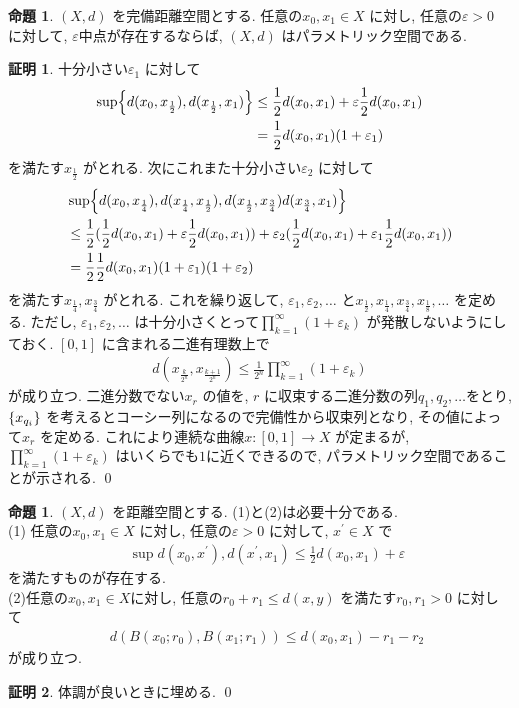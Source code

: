 \documentclass[platex, driver=dvipdfm, ja = standard, 10pt, fleqn, label-section=none]{bxjsarticle}
\theoremstyle{definition}
\newtheorem{prop}[dfn]{命題}
\newtheorem*{pf*}{証明}
\newcommand{\veps}{\varepsilon}
\newcommand{\cbra}[1]{\mleft\{#1\mright\}}
\renewcommand{\;}{\, ; \,}
\begin{document}
\begin{prop}$(X, d)$ を完備距離空間とする. 任意の$x_0, x_1 \in X$ に対し, 任意の$\veps > 0$ に対して, $\veps$中点が存在するならば, $(X, d)$ はパラメトリック空間である. 
\end{prop}
\begin{pf*}
十分小さい$\veps_1$ に対して
\begin{align*}  \sup \cbra{ d(x_0 ,  x_{\frac{1}{2}}     ) , d(x_{\frac{1}{2}}  , x_1)}    & \leq \frac{1}{2} d(x_0, x_1) + \veps \frac{1}{2} d(x_0, x_1)  \\
&= \frac{1}{2} d(x_0, x_1)  (1 + \veps_1) \end{align*}
を満たす$x_{\frac{1}{2}} $ がとれる. 次にこれまた十分小さい$\veps_2$ に対して
\begin{align*} & \sup \cbra{ d(x_0 ,  x_{\frac{1}{4}} ) , d(x_{\frac{1}{4}}, x_{\frac{1}{2}}  ), d(x_{\frac{1}{2}}, x_{\frac{3}{4}} ) d(x_{\frac{3}{4}}  , x_1)}     \\
& \leq \frac{1}{2}( \frac{1}{2} d(x_0, x_1)  + \veps \frac{1}{2}d(x_0, x_1)  ) + \veps_2 (\frac{1}{2} d(x_0, x_1)  + \veps_1 \frac{1}{2} d(x_0, x_1) ) \\
&= \frac{1}{2}\frac{1}{2} d(x_0, x_1)  (1 + \veps _1) (1 + \veps_2) \end{align*}
を満たす$x_{\frac{1}{4}} , x_{\frac{3}{4}}$ がとれる. これを繰り返して, $\veps_1, \veps_2, \ldots $ と$x_{\frac{1}{2}} , x_{\frac{1}{4}}, x_{\frac{3}{4}}, x_{\frac{1}{8}} , \ldots   $ を定める. ただし, $\veps_1, \veps_2, \ldots $ は十分小さくとって$\prod _{k = 1}^\infty (1 + \veps_k) $ が発散しないようにしておく. 
$[0, 1]$ に含まれる二進有理数上で
\begin{align*} d(x_{\frac{k}{2^n}} , x_{\frac{k + 1}{2^n} } ) \leq \frac{1}{2^n} \prod _{k = 1}^\infty (1 + \veps_k) \end{align*}
が成り立つ. 二進分数でない$x_r$ の値を, $r$ に収束する二進分数の列$q_1, q_2, \ldots $をとり, $\cbra{x_{q_i}}$ を考えるとコーシー列になるので完備性から収束列となり, その値によって$x_r$ を定める. これにより連続な曲線$x: [0,1] \rightarrow X$ が定まるが,  $\prod _{k = 1}^\infty (1 + \veps_k) $ はいくらでも$1$に近くできるので, パラメトリック空間であることが示される. 
\qed
\end{pf*}



\begin{prop}
$(X, d)$ を距離空間とする. (1)と(2)は必要十分である.\\
(1) 任意の$x_0, x_1 \in X$ に対し, 任意の$\veps > 0$ に対して, $x^\prime \in X$ で
\begin{align*} \quad  \sup{ d(x_0 ,  x^\prime) , d(x^\prime , x_1)} \leq \frac{1}{2} d(x_0, x_1) + \veps \end{align*}
 を満たすものが存在する.  \\
 (2)任意の$x_0, x_1 \in X$に対し, 任意の$r_0 + r_1 \leq d(x,y)$ を満たす$r_0 , r_1 > 0$ に対して
 \begin{align*} \quad d(B(x_0; r_0), B(x_1 ; r_1)) \leq d(x_0, x_1) - r_1 - r_2\end{align*}
 が成り立つ. 
\end{prop}
\begin{pf*}
体調が良いときに埋める. 
\qed
\end{pf*}
\end{document}
